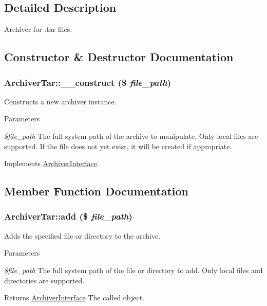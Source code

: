 \subsection{Detailed Description}
Archiver for .tar files. 

\subsection{Constructor \& Destructor Documentation}
\hypertarget{classArchiverTar_af3727d4c5fa466d4aabde81bb9d4c7df}{
\subsubsection[{\_\-\_\-construct}]{\setlength{\rightskip}{0pt plus 5cm}ArchiverTar::\_\-\_\-construct (\$ {\em file\_\-path})}}
\label{classArchiverTar_af3727d4c5fa466d4aabde81bb9d4c7df}
Constructs a new archiver instance.


\begin{DoxyParams}{Parameters}
\item[{\em \$file\_\-path}]The full system path of the archive to manipulate. Only local files are supported. If the file does not yet exist, it will be created if appropriate. \end{DoxyParams}


Implements \hyperlink{interfaceArchiverInterface_aa380cf3e1bcf80763ccd6c790b50aee5}{ArchiverInterface}.

\subsection{Member Function Documentation}
\hypertarget{classArchiverTar_a23c343bebf4ba3a61fc8087427406bbe}{
\subsubsection[{add}]{\setlength{\rightskip}{0pt plus 5cm}ArchiverTar::add (\$ {\em file\_\-path})}}
\label{classArchiverTar_a23c343bebf4ba3a61fc8087427406bbe}
Adds the specified file or directory to the archive.


\begin{DoxyParams}{Parameters}
\item[{\em \$file\_\-path}]The full system path of the file or directory to add. Only local files and directories are supported.\end{DoxyParams}
\begin{DoxyReturn}{Returns}
\hyperlink{interfaceArchiverInterface}{ArchiverInterface} The called object. 
\end{DoxyReturn}


